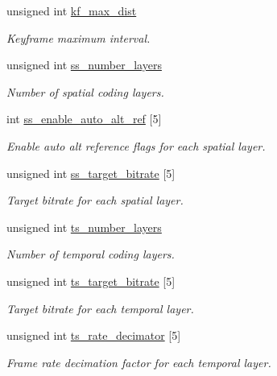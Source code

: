 \begin{DoxyCompactItemize}
unsigned int \hyperlink{structvpx__codec__enc__cfg_ae018440136e271743376730413d25a9b}{kf\+\_\+max\+\_\+dist}
\begin{DoxyCompactList}\small\item\em Keyframe maximum interval. \end{DoxyCompactList}\item 
unsigned int \hyperlink{structvpx__codec__enc__cfg_a1e5e1d00b22f2ba8c5c7230f31900f95}{ss\+\_\+number\+\_\+layers}
\begin{DoxyCompactList}\small\item\em Number of spatial coding layers. \end{DoxyCompactList}\item 
int \hyperlink{structvpx__codec__enc__cfg_a26e33bbfa43485c21ea58da6cee23c36}{ss\+\_\+enable\+\_\+auto\+\_\+alt\+\_\+ref} \mbox{[}5\mbox{]}
\begin{DoxyCompactList}\small\item\em Enable auto alt reference flags for each spatial layer. \end{DoxyCompactList}\item 
unsigned int \hyperlink{structvpx__codec__enc__cfg_a5ff2f5884109736d0c2464bc156fda1f}{ss\+\_\+target\+\_\+bitrate} \mbox{[}5\mbox{]}
\begin{DoxyCompactList}\small\item\em Target bitrate for each spatial layer. \end{DoxyCompactList}\item 
unsigned int \hyperlink{structvpx__codec__enc__cfg_a16d4549a30cbd585e3c3056ef873d8c7}{ts\+\_\+number\+\_\+layers}
\begin{DoxyCompactList}\small\item\em Number of temporal coding layers. \end{DoxyCompactList}\item 
unsigned int \hyperlink{structvpx__codec__enc__cfg_aba7ceb7a90500a8f76aff89575737f3a}{ts\+\_\+target\+\_\+bitrate} \mbox{[}5\mbox{]}
\begin{DoxyCompactList}\small\item\em Target bitrate for each temporal layer. \end{DoxyCompactList}\item 
unsigned int \hyperlink{structvpx__codec__enc__cfg_ad40c30846ef8ef1d8684f10a491ec535}{ts\+\_\+rate\+\_\+decimator} \mbox{[}5\mbox{]}
\begin{DoxyCompactList}\small\item\em Frame rate decimation factor for each temporal layer. \end{DoxyCompactList}\item 

\end{DoxyCompactItemize}
